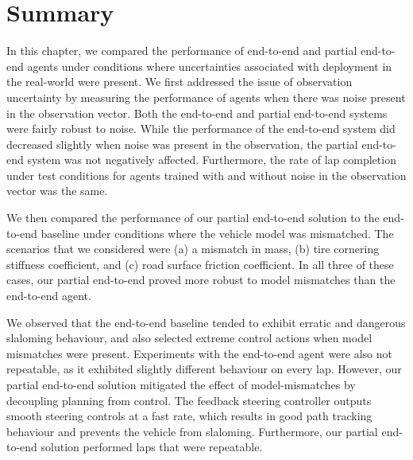 \section{Summary}

In this chapter, we compared the performance of end-to-end and partial end-to-end agents under conditions where uncertainties associated with deployment in the real-world were present.
We first addressed the issue of observation uncertainty by measuring the performance of agents when there was noise present in the observation vector.
Both the end-to-end and partial end-to-end systems were fairly robust to noise.
While the performance of the end-to-end system did decreased slightly when noise was present in the observation, the partial end-to-end system was not negatively affected.
Furthermore, the rate of lap completion under test conditions for agents trained with and without noise in the observation vector was the same.


We then compared the performance of our partial end-to-end solution to the end-to-end baseline under conditions where the vehicle model was mismatched.
The scenarios that we considered were (a) a mismatch in mass, (b) tire cornering stiffness coefficient, and (c) road surface friction coefficient.
In all three of these cases, our partial end-to-end proved more robust to model mismatches than the end-to-end agent.

We observed that the end-to-end baseline tended to exhibit erratic and dangerous slaloming behaviour, and also selected extreme control actions when model mismatches were present.
Experiments with the end-to-end agent were also not repeatable, as it exhibited slightly different behaviour on every lap.
However, our partial end-to-end solution mitigated the effect of model-mismatches by decoupling planning from control.
The feedback steering controller outputs smooth steering controls at a fast rate, which results in good path tracking behaviour and prevents the vehicle from slaloming.
Furthermore, our partial end-to-end solution performed laps that were repeatable.



